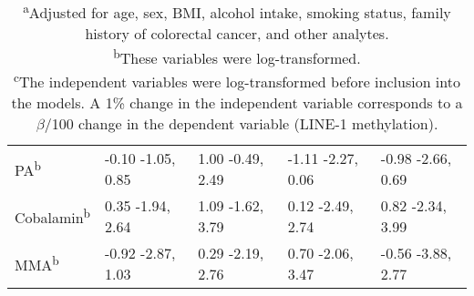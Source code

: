 \begin{sidewaystable}
\begin{adjustbox}{width=18cm}
\begin{tabular}{L{3cm}C{4.0cm}C{4.0cm}C{4.0cm}C{4.0cm}}
PA\textsuperscript{b} & { {}-0.10} {}-1.05, 0.85 & { 1.00} {}-0.49, 2.49 & { {}-1.11} {}-2.27, 0.06 & { {}-0.98} {}-2.66, 0.69\\

Cobalamin\textsuperscript{b} & { 0.35} {}-1.94, 2.64 & { 1.09} {}-1.62, 3.79 & { 0.12} {}-2.49, 2.74 & { 0.82} {}-2.34, 3.99\\

MMA\textsuperscript{b} & { {}-0.92} {}-2.87, 1.03 & { 0.29} {}-2.19, 2.76 & { 0.70} {}-2.06, 3.47 & { {}-0.56} {}-3.88, 2.77\\
\hline
\end{tabular}
\end{adjustbox}
\caption*{\footnotesize{\textsuperscript{a}Adjusted for age, sex, BMI, alcohol intake, smoking status, family history of colorectal cancer, and other analytes. \\ \textsuperscript{b}These variables were log-transformed. \\ \textsuperscript{c}The independent variables were log-transformed before inclusion into the models. A 1\% change in the independent variable corresponds to a $\beta$/100 change in the dependent variable (LINE-1 methylation).}}
\end{sidewaystable}


